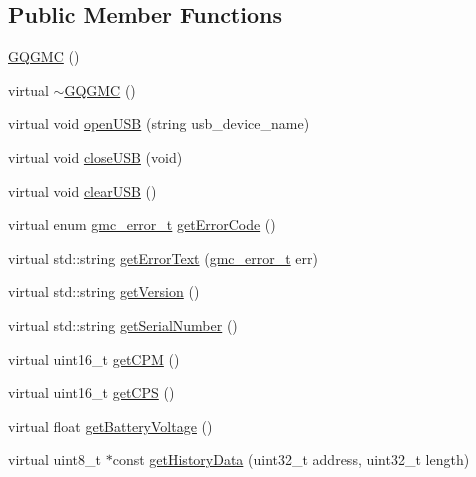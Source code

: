 \subsection*{\-Public \-Member \-Functions}
\begin{DoxyCompactItemize}
\item 
\hyperlink{class_g_q_l_l_c_1_1_g_q_g_m_c_aab4ca26b11ecc6ddf461d360be97d36f}{\-G\-Q\-G\-M\-C} ()
\item 
virtual \hyperlink{class_g_q_l_l_c_1_1_g_q_g_m_c_a0175cfeaf06740c6f8eeff8f73cd6b5d}{$\sim$\-G\-Q\-G\-M\-C} ()
\item 
virtual void \hyperlink{class_g_q_l_l_c_1_1_g_q_g_m_c_a8ce22d9a10dfba3cd423964e8da7caef}{open\-U\-S\-B} (string usb\-\_\-device\-\_\-name)
\item 
virtual void \hyperlink{class_g_q_l_l_c_1_1_g_q_g_m_c_a072bcfc93178abe90eb7a7d65ba969e3}{close\-U\-S\-B} (void)
\item 
virtual void \hyperlink{class_g_q_l_l_c_1_1_g_q_g_m_c_aeb60bd5324fc103644f8198545b6d315}{clear\-U\-S\-B} ()
\item 
virtual enum \hyperlink{namespace_g_q_l_l_c_a26199f442b869bff06756c6bc1a9f892}{gmc\-\_\-error\-\_\-t} \hyperlink{class_g_q_l_l_c_1_1_g_q_g_m_c_ad765e66d47e2c37c6f59835d0afbed27}{get\-Error\-Code} ()
\item 
virtual std\-::string \hyperlink{class_g_q_l_l_c_1_1_g_q_g_m_c_a87d5991f967c000fa9231892cf821825}{get\-Error\-Text} (\hyperlink{namespace_g_q_l_l_c_a26199f442b869bff06756c6bc1a9f892}{gmc\-\_\-error\-\_\-t} err)
\item 
virtual std\-::string \hyperlink{class_g_q_l_l_c_1_1_g_q_g_m_c_ae6f8916ae009e38a2e499e4ef3717537}{get\-Version} ()
\item 
virtual std\-::string \hyperlink{class_g_q_l_l_c_1_1_g_q_g_m_c_a8b7bee2b36a224360b7405a8652a540d}{get\-Serial\-Number} ()
\item 
virtual uint16\-\_\-t \hyperlink{class_g_q_l_l_c_1_1_g_q_g_m_c_a9d200d16d9e90fe7291cb4fd990f08b2}{get\-C\-P\-M} ()
\item 
virtual uint16\-\_\-t \hyperlink{class_g_q_l_l_c_1_1_g_q_g_m_c_a2757a936a467a4b326c7dafe7df6d284}{get\-C\-P\-S} ()
\item 
virtual float \hyperlink{class_g_q_l_l_c_1_1_g_q_g_m_c_a1197f962087328f93b1d7a4083ea91f8}{get\-Battery\-Voltage} ()
\item 
virtual uint8\-\_\-t $\ast$const \hyperlink{class_g_q_l_l_c_1_1_g_q_g_m_c_ac47ffb728f31eb5d56651f6b1da79de0}{get\-History\-Data} (uint32\-\_\-t address, uint32\-\_\-t length)

\end{DoxyCompactItemize}
